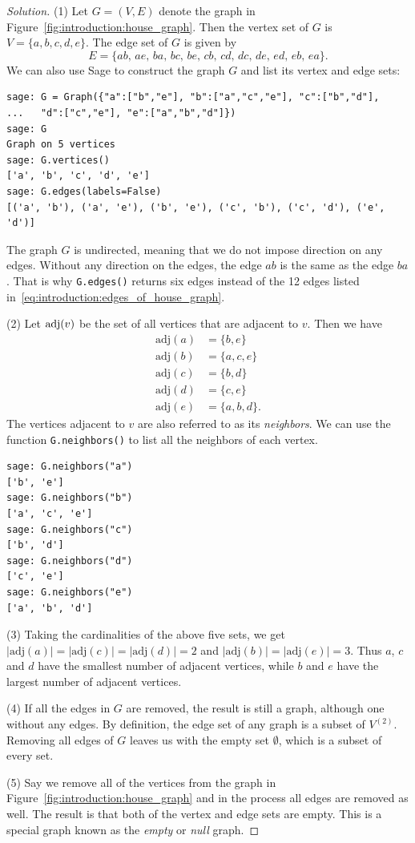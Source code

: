 \begin{proof}[Solution]
(1) Let $G = (V, E)$ denote the graph in
Figure~\ref{fig:introduction:house_graph}. Then the vertex set of $G$
is $V = \{ a, b, c, d, e \}$. The edge set of $G$ is given by
\begin{equation}
\label{eq:introduction:edges_of_house_graph}
E
=
\{ab,\, ae,\, ba,\, bc,\, be,\, cb,\, cd,\, dc,\, de,\, ed,\, eb,\, ea\}.
\end{equation}
We can also use Sage to construct the graph $G$ and list its vertex
and edge sets:
%
\begin{lstlisting}
sage: G = Graph({"a":["b","e"], "b":["a","c","e"], "c":["b","d"],
...   "d":["c","e"], "e":["a","b","d"]})
sage: G
Graph on 5 vertices
sage: G.vertices()
['a', 'b', 'c', 'd', 'e']
sage: G.edges(labels=False)
[('a', 'b'), ('a', 'e'), ('b', 'e'), ('c', 'b'), ('c', 'd'), ('e', 'd')]
\end{lstlisting}
%
The graph $G$ is undirected, meaning that we do not impose direction
on any edges. Without any direction on the edges, the edge $ab$ is the
same as the edge $ba$. That is why \texttt{G.edges()} returns six
edges instead of the 12 edges listed
in~\eqref{eq:introduction:edges_of_house_graph}.

\index{$\adj$}
(2) Let $\operatorname*{adj}(v)$ be the set of all vertices that are adjacent
to $v$. Then we have
%
\begin{align*}
\text{adj}(a) &= \{ b, e \} \\
\text{adj}(b) &= \{ a, c, e \} \\
\text{adj}(c) &= \{ b, d \} \\
\text{adj}(d) &= \{ c, e \} \\
\text{adj}(e) &= \{ a, b, d \}.
\end{align*}
%
The vertices adjacent to $v$ are also referred to as its
\emph{neighbors}. We can use the function \texttt{G.neighbors()} to
list all the neighbors of each vertex.
%
\begin{lstlisting}
sage: G.neighbors("a")
['b', 'e']
sage: G.neighbors("b")
['a', 'c', 'e']
sage: G.neighbors("c")
['b', 'd']
sage: G.neighbors("d")
['c', 'e']
sage: G.neighbors("e")
['a', 'b', 'd']
\end{lstlisting}

(3) Taking the cardinalities of the above five sets, we get
$|\text{adj}(a)| = |\text{adj}(c)| = |\text{adj}(d)| = 2$ and
$|\text{adj}(b)| = |\text{adj}(e)| = 3$. Thus $a$, $c$ and $d$ have
the smallest number of adjacent vertices, while $b$ and $e$ have the
largest number of adjacent vertices.

(4) If all the edges in $G$ are removed, the result is still a graph,
although one without any edges. By definition, the edge set of any
graph is a subset of $V^{(2)}$. Removing all edges of $G$ leaves us
with the empty set $\emptyset$, which is a subset of every set.

(5) Say we remove all of the vertices from the graph in
Figure~\ref{fig:introduction:house_graph} and in the process all edges
are removed as well. The result is that both of the vertex and edge
sets are empty. This is a special graph known as the \emph{empty} or
\emph{null} graph.
\end{proof}

